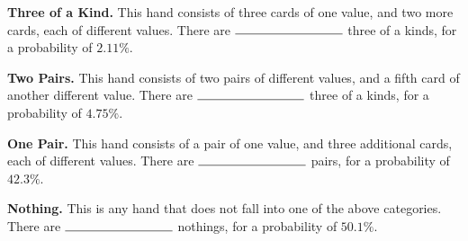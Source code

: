 \documentclass[11pt]{article}
\begin{document}
{\bf Three of a Kind.} This hand consists of three cards of one value, and two more cards, each of different values. There are $\rule{3cm}{0.15mm}$ three of a kinds, for a probability of $2.11\%$.

{\bf Two Pairs.} This hand consists of two pairs of different values, and a fifth card of another different value. There are $\rule{3cm}{0.15mm}$ three of a kinds, for a probability of $4.75\%$.

{\bf One Pair.} This hand consists of a pair of one value, and three additional cards, each of different values. There are $\rule{3cm}{0.15mm}$ pairs, for a probability of $42.3\%$.

{\bf Nothing.} This is any hand that does not fall into one of the above categories. There are $\rule{3cm}{0.15mm}$ nothings, for a probability of $50.1\%$.
\end{document}
